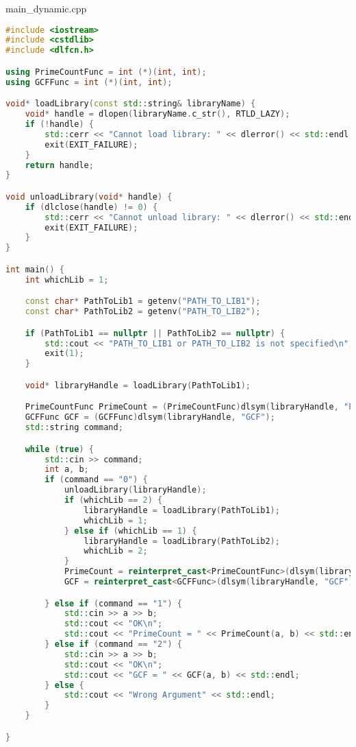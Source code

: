 \documentclass[a4paper, 12pt]{article}
\begin{document}
main\_dynamic.cpp
\begin{lstlisting}[language=C++]
#include <iostream>
#include <cstdlib>
#include <dlfcn.h>

using PrimeCountFunc = int (*)(int, int);
using GCFFunc = int (*)(int, int);

void* loadLibrary(const std::string& libraryName) {
    void* handle = dlopen(libraryName.c_str(), RTLD_LAZY);
    if (!handle) {
        std::cerr << "Cannot load library: " << dlerror() << std::endl;
        exit(EXIT_FAILURE);
    }
    return handle;
}

void unloadLibrary(void* handle) {
    if (dlclose(handle) != 0) {
        std::cerr << "Cannot unload library: " << dlerror() << std::endl;
        exit(EXIT_FAILURE);
    }
}

int main() {
    int whichLib = 1;

    const char* PathToLib1 = getenv("PATH_TO_LIB1");
    const char* PathToLib2 = getenv("PATH_TO_LIB2");

    if (PathToLib1 == nullptr || PathToLib2 == nullptr) {
        std::cout << "PATH_TO_LIB1 or PATH_TO_LIB2 is not specified\n";
        exit(1);
    }

    void* libraryHandle = loadLibrary(PathToLib1);

    PrimeCountFunc PrimeCount = (PrimeCountFunc)dlsym(libraryHandle, "PrimeCount");
    GCFFunc GCF = (GCFFunc)dlsym(libraryHandle, "GCF");
    std::string command;

    while (true) {
        std::cin >> command;
        int a, b;
        if (command == "0") {
            unloadLibrary(libraryHandle);
            if (whichLib == 2) {
                libraryHandle = loadLibrary(PathToLib1);
                whichLib = 1;
            } else if (whichLib == 1) {
                libraryHandle = loadLibrary(PathToLib2);
                whichLib = 2;
            }
            PrimeCount = reinterpret_cast<PrimeCountFunc>(dlsym(libraryHandle, "PrimeCount"));
            GCF = reinterpret_cast<GCFFunc>(dlsym(libraryHandle, "GCF"));

        } else if (command == "1") {
            std::cin >> a >> b;
            std::cout << "OK\n";
            std::cout << "PrimeCount = " << PrimeCount(a, b) << std::endl;
        } else if (command == "2") {
            std::cin >> a >> b;
            std::cout << "OK\n";
            std::cout << "GCF = " << GCF(a, b) << std::endl;
        } else {
            std::cout << "Wrong Argument" << std::endl;
        }
    }

}
\end{lstlisting}
\end{document}
